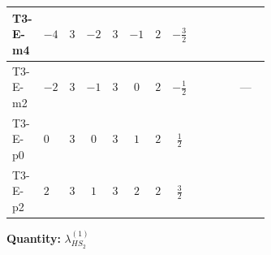 \documentclass[8pt]{article}
\begin{document}
\begin{landscape}
\begin{longtable}{@{}llcccccc >{\raggedright\arraybackslash}p{0.21\linewidth} >{\raggedright\arraybackslash}p{0.21\linewidth} >{\raggedright\arraybackslash}p{0.21\linewidth}@{}}
\midrule
T3-E-m4 & $-4$ & $3$ & $-2$ & $3$ & $-1$ & $2$ & $-\frac{3}{2}$ & \scriptsize\adjustbox{max width=\linewidth}{$\begin{gathered} +6 {g_2}^4\end{gathered}$} & \scriptsize\adjustbox{max width=\linewidth}{$\begin{gathered} -\frac{33 {g_2}^2 {\lambda_{HS_2}^{(1)}}}{2}\end{gathered}$} & \scriptsize\adjustbox{max width=\linewidth}{$\begin{gathered} +3 {g_1}^4\end{gathered}$} \\
\midrule
T3-E-m2 & $-2$ & $3$ & $-1$ & $3$ & $0$ & $2$ & $-\frac{1}{2}$ & \scriptsize\adjustbox{max width=\linewidth}{$\begin{gathered} +6 {g_2}^4\end{gathered}$} & \scriptsize\adjustbox{max width=\linewidth}{$\begin{gathered} -\frac{33 {g_2}^2 {\lambda_{HS_2}^{(1)}}}{2}\end{gathered}$} & --- \\
\midrule
T3-E-p0 & $0$ & $3$ & $0$ & $3$ & $1$ & $2$ & $\frac{1}{2}$ & \scriptsize\adjustbox{max width=\linewidth}{$\begin{gathered} +6 {g_2}^4\end{gathered}$} & \scriptsize\adjustbox{max width=\linewidth}{$\begin{gathered} -\frac{33 {g_2}^2 {\lambda_{HS_2}^{(1)}}}{2}\end{gathered}$} & \scriptsize\adjustbox{max width=\linewidth}{$\begin{gathered} +3 {g_1}^4\end{gathered}$} \\
\midrule
T3-E-p2 & $2$ & $3$ & $1$ & $3$ & $2$ & $2$ & $\frac{3}{2}$ & \scriptsize\adjustbox{max width=\linewidth}{$\begin{gathered} +6 {g_2}^4\end{gathered}$} & \scriptsize\adjustbox{max width=\linewidth}{$\begin{gathered} -\frac{33 {g_2}^2 {\lambda_{HS_2}^{(1)}}}{2}\end{gathered}$} & \scriptsize\adjustbox{max width=\linewidth}{$\begin{gathered} +12 {g_1}^4\end{gathered}$} \\
\midrule
\bottomrule
\end{longtable}
\clearpage
\noindent\textbf{Quantity: }$\lambda_{HS_2}^{(1)}$\par\smallskip

\end{landscape}
\end{document}
